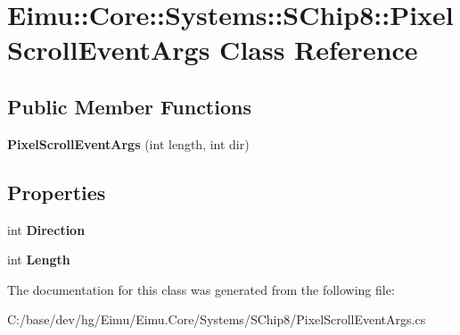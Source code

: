 \hypertarget{class_eimu_1_1_core_1_1_systems_1_1_s_chip8_1_1_pixel_scroll_event_args}{
\section{Eimu::Core::Systems::SChip8::PixelScrollEventArgs Class Reference}
\label{class_eimu_1_1_core_1_1_systems_1_1_s_chip8_1_1_pixel_scroll_event_args}
}
\subsection*{Public Member Functions}
\begin{DoxyCompactItemize}
\item 
\hypertarget{class_eimu_1_1_core_1_1_systems_1_1_s_chip8_1_1_pixel_scroll_event_args_a59b9e37f347c8682d4a6b95a3ccd1a69}{
{\bfseries PixelScrollEventArgs} (int length, int dir)}
\label{class_eimu_1_1_core_1_1_systems_1_1_s_chip8_1_1_pixel_scroll_event_args_a59b9e37f347c8682d4a6b95a3ccd1a69}

\end{DoxyCompactItemize}
\subsection*{Properties}
\begin{DoxyCompactItemize}
\item 
\hypertarget{class_eimu_1_1_core_1_1_systems_1_1_s_chip8_1_1_pixel_scroll_event_args_a727504630bbe31356336e8931cf170ed}{
int {\bfseries Direction}}
\label{class_eimu_1_1_core_1_1_systems_1_1_s_chip8_1_1_pixel_scroll_event_args_a727504630bbe31356336e8931cf170ed}

\item 
\hypertarget{class_eimu_1_1_core_1_1_systems_1_1_s_chip8_1_1_pixel_scroll_event_args_a28e84a12d50b1a4cd1cf1ef735d3d723}{
int {\bfseries Length}}
\label{class_eimu_1_1_core_1_1_systems_1_1_s_chip8_1_1_pixel_scroll_event_args_a28e84a12d50b1a4cd1cf1ef735d3d723}

\end{DoxyCompactItemize}


The documentation for this class was generated from the following file:\begin{DoxyCompactItemize}
\item 
C:/base/dev/hg/Eimu/Eimu.Core/Systems/SChip8/PixelScrollEventArgs.cs\end{DoxyCompactItemize}
